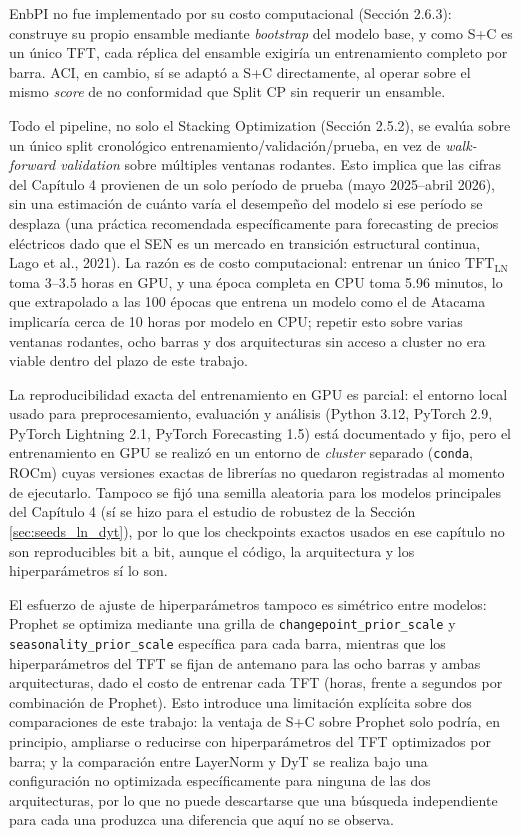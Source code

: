 EnbPI no fue implementado por su costo computacional (Sección 2.6.3): construye su propio ensamble mediante \textit{bootstrap} del modelo base, y como S+C es un único TFT, cada réplica del ensamble exigiría un entrenamiento completo por barra. ACI, en cambio, sí se adaptó a S+C directamente, al operar sobre el mismo \textit{score} de no conformidad que Split CP sin requerir un ensamble.

Todo el pipeline, no solo el Stacking Optimization (Sección 2.5.2), se evalúa sobre un único split cronológico entrenamiento/validación/prueba, en vez de \textit{walk-forward validation} sobre múltiples ventanas rodantes. Esto implica que las cifras del Capítulo 4 provienen de un solo período de prueba (mayo 2025--abril 2026), sin una estimación de cuánto varía el desempeño del modelo si ese período se desplaza (una práctica recomendada específicamente para forecasting de precios eléctricos dado que el SEN es un mercado en transición estructural continua, Lago et al., 2021). La razón es de costo computacional: entrenar un único $\text{TFT}_\text{LN}$ toma 3--3.5 horas en GPU, y una época completa en CPU toma 5.96 minutos, lo que extrapolado a las 100 épocas que entrena un modelo como el de Atacama implicaría cerca de 10 horas por modelo en CPU; repetir esto sobre varias ventanas rodantes, ocho barras y dos arquitecturas sin acceso a cluster no era viable dentro del plazo de este trabajo.

La reproducibilidad exacta del entrenamiento en GPU es parcial: el entorno local usado para preprocesamiento, evaluación y análisis (Python 3.12, PyTorch 2.9, PyTorch Lightning 2.1, PyTorch Forecasting 1.5) está documentado y fijo, pero el entrenamiento en GPU se realizó en un entorno de \textit{cluster} separado (\texttt{conda}, ROCm) cuyas versiones exactas de librerías no quedaron registradas al momento de ejecutarlo. Tampoco se fijó una semilla aleatoria para los modelos principales del Capítulo 4 (sí se hizo para el estudio de robustez de la Sección \ref{sec:seeds_ln_dyt}), por lo que los checkpoints exactos usados en ese capítulo no son reproducibles bit a bit, aunque el código, la arquitectura y los hiperparámetros sí lo son.

El esfuerzo de ajuste de hiperparámetros tampoco es simétrico entre modelos: Prophet se optimiza mediante una grilla de \texttt{changepoint\_prior\_scale} y \texttt{seasonality\_prior\_scale} específica para cada barra, mientras que los hiperparámetros del TFT se fijan de antemano para las ocho barras y ambas arquitecturas, dado el costo de entrenar cada TFT (horas, frente a segundos por combinación de Prophet). Esto introduce una limitación explícita sobre dos comparaciones de este trabajo: la ventaja de S+C sobre Prophet solo podría, en principio, ampliarse o reducirse con hiperparámetros del TFT optimizados por barra; y la comparación entre LayerNorm y DyT se realiza bajo una configuración no optimizada específicamente para ninguna de las dos arquitecturas, por lo que no puede descartarse que una búsqueda independiente para cada una produzca una diferencia que aquí no se observa.

